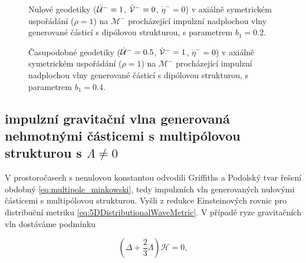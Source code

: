 \begin{figure}[ht]
    \centering
    \caption{Nulové geodetiky ($\dot {\mathcal{U}}^-=1$, $\dot {\mathcal{V}}^-=0$, $\dot \eta^-=0$) v axiálně symetrickém uspořádání ($\rho=1$) na $\mathcal{M}^-$ procházející impulzní nadplochou vlny generované částicí s dipólovou strukturou,
    s parametrem $b_1=0.2$.}
    \label{fig:DipoleAxial}
\end{figure}
\begin{figure}[ht]
    \centering
    \caption{Časupodobné geodetiky ($\dot {\mathcal{U}}^-=0.5$, $\dot {\mathcal{V}}^-=1$, $\dot \eta^-=0$) v axiálně symetrickém uspořádání ($\rho=1$) na $\mathcal{M}^-$ procházející impulzní nadplochou vlny generované částicí s dipólovou strukturou,
    s parametrem $b_1=0.4$.}
    \label{fig:DipoleAxialTimelike}
\end{figure}
\clearpage

\subsection{impulzní gravitační vlna generovaná nehmotnými částicemi s multipólovou strukturou s $\Lambda\neq 0$}

V prostoročasech s nenulovou konstantou odvodili Griffiths a Podolský \cite{Podolsky1997} tvar řešení obdobný \eqref{eq:multipole_minkowski},
tedy impulzních vln generovaných nulovými částicemi s multipólovou strukturou. Vyšli z redukce Einsteinových rovnic pro distribuční
metriku \eqref{eq:5DDistributionalWaveMetric}. V případě ryze gravitačních vln dostáváme podmínku

\begin{equation}
    \label{eq:podminka_na_H_lambda_stare}
    \left(\Delta + \frac{2}{3} \Lambda \right)\mathcal{H} = 0,
\end{equation}

